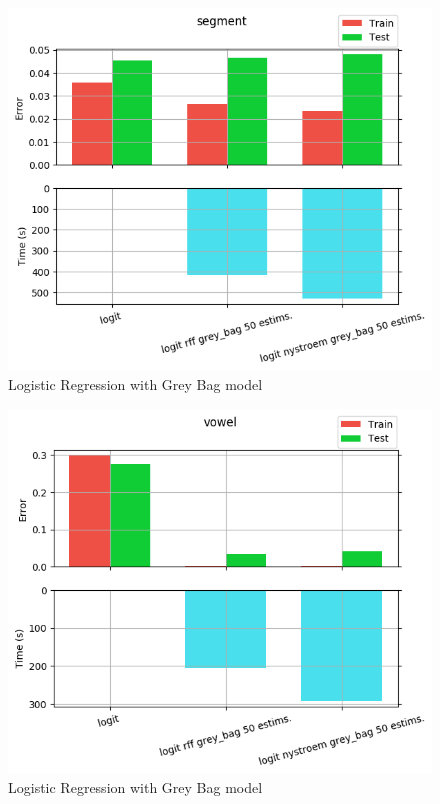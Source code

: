 \begin{figure}[th]
\centering
\includegraphics[scale=\imgscale]{Figures/2_3/segment}
\decoRule
\caption[2.3 segment]{Logistic Regression with Grey Bag model}
\label{fig:2_3_segment}
\end{figure}

\begin{figure}[th]
\centering
\includegraphics[scale=\imgscale]{Figures/2_3/vowel}
\decoRule
\caption[2.3 vowel]{Logistic Regression with Grey Bag model}
\label{fig:vowel}
\end{figure}
